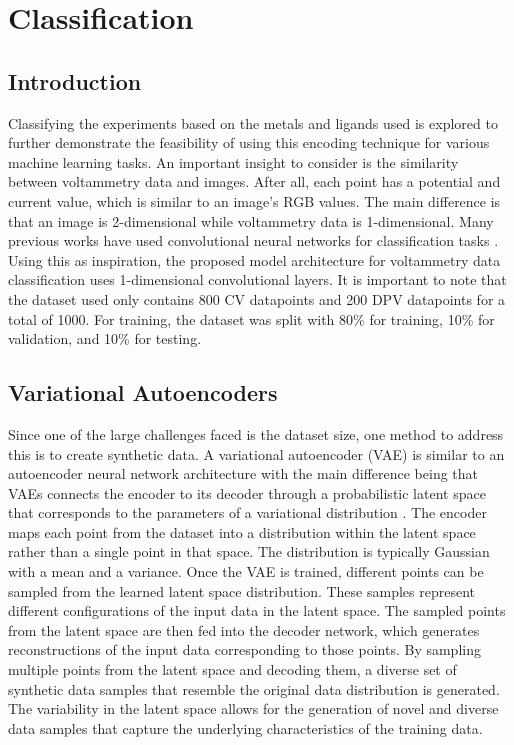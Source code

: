 \chapter{Classification} \label{chap:chap-3}




\section{Introduction}
Classifying the experiments based on the metals and ligands used is explored to further demonstrate the feasibility of using this encoding technique for various machine learning tasks. An important insight to consider is the similarity between voltammetry data and images. After all, each point has a potential and current value, which is similar to an image's RGB values. The main difference is that an image is 2-dimensional while voltammetry data is 1-dimensional. Many previous works have used convolutional neural networks for classification tasks \cite{SHARMA2018377}. Using this as inspiration, the proposed model architecture for voltammetry data classification uses 1-dimensional convolutional layers.  
It is important to note that the dataset used only contains 800 CV datapoints and 200 DPV datapoints for a total of 1000. For training, the dataset was split with 80\% for training, 10\% for validation, and 10\% for testing. 
\section{Variational Autoencoders}
Since one of the large challenges faced is the dataset size, one method to address this is to create synthetic data. 
A variational autoencoder (VAE) is similar to an autoencoder neural network architecture with the main difference being that VAEs connects the encoder to its decoder through a probabilistic latent space that corresponds to the parameters of a variational distribution \cite{PinheiroCinelli2021}. The encoder maps each point from the dataset into a distribution within the latent space rather than a single point in that space. The distribution is typically Gaussian with a mean and a variance. Once the VAE is trained, different points can be sampled from the learned latent space distribution. These samples represent different configurations of the input data in the latent space. The sampled points from the latent space are then fed into the decoder network, which generates reconstructions of the input data corresponding to those points. By sampling multiple points from the latent space and decoding them, a diverse set of synthetic data samples that resemble the original data distribution is generated. The variability in the latent space allows for the generation of novel and diverse data samples that capture the underlying characteristics of the training data.
